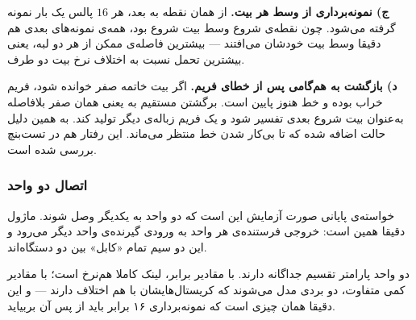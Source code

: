 \documentclass[10pt,a4paper]{article}
\begin{document}
\textbf{ج) نمونه‌برداری از وسط هر بیت.} از همان نقطه به بعد، هر $16$ پالس یک بار نمونه گرفته می‌شود. چون نقطه‌ی شروع وسط بیت شروع بود، همه‌ی نمونه‌های بعدی هم دقیقا وسط بیت خودشان می‌افتند — بیشترین فاصله‌ی ممکن از هر دو لبه، یعنی بیشترین تحمل نسبت به اختلاف نرخ بیت دو طرف.

\textbf{د) بازگشت به هم‌گامی پس از خطای فریم.} اگر بیت خاتمه صفر خوانده شود، فریم خراب بوده و خط هنوز پایین است. برگشتن مستقیم به  یعنی همان صفر بلافاصله به‌عنوان بیت شروع بعدی تفسیر شود و یک فریم زباله‌ی دیگر تولید کند. به همین دلیل حالت  اضافه شده که تا بی‌کار شدن خط منتظر می‌ماند. این رفتار هم در تست‌بنچ بررسی شده است.

\begin{latin}

\end{latin}

\subsubsection*{اتصال دو واحد}

خواسته‌ی پایانی صورت آزمایش این است که دو واحد به یکدیگر وصل شوند. ماژول  دقیقا همین است: خروجی فرستنده‌ی هر واحد به ورودی گیرنده‌ی واحد دیگر می‌رود و این دو سیم تمام «کابل» بین دو دستگاه‌اند.

\begin{center}
\begin{latin}
\end{latin}
\end{center}

دو واحد پارامتر تقسیم {جداگانه} دارند. با مقادیر برابر، لینک کاملا هم‌نرخ است؛ با مقادیر کمی متفاوت، دو بردی مدل می‌شوند که کریستال‌هایشان با هم اختلاف دارند — و این دقیقا همان چیزی است که نمونه‌برداری ۱۶ برابر باید از پس آن بربیاید.
\end{document}
